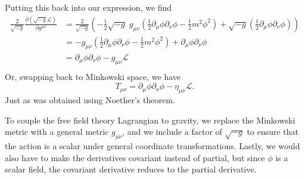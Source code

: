 \documentclass[12pt]{article}
\newcommand{\delmu}{\partial_{\mu}}
\newcommand{\delnu}{\partial_{\nu}}
\newcommand{\+}{\dagger}
\begin{document}
Putting this back into our expression, we find
\begin{align*}
    \frac{2}{\sqrt{-g}}\frac{\partial(\sqrt{-g}\mathcal{L})}{\partial g^{\mu\nu}}
    &= \frac{2}{\sqrt{-g}} \left( -\frac{1}{2}\sqrt{-g} \;
    g_{\mu\nu}\left(\frac{1}{2}\delmu\phi\delnu\phi - \frac{1}{2}m^2\phi^2\right)+
    \sqrt{-g}\left(\frac{1}{2}\delmu\phi\delnu\phi \right)\right)\\
    &= -g_{\mu\nu}\left(\frac{1}{2}\delmu\phi\delnu\phi - \frac{1}{2}m^2\phi^2\right) + \delmu\phi\delnu\phi \\
    &= \delmu\phi\delnu\phi - g_{\mu\nu}\mathcal{L}\\
\end{align*}
Or, swapping back to Minkowski space, we have
\begin{equation*}
    \boxed{T_{\mu\nu} = \delmu\phi\delnu\phi - \eta_{\mu\nu}\mathcal{L}.}
\end{equation*}
Just as was obtained using Noether's theorem.

To couple the free field theory Lagrangian to gravity, we replace the Minkowski
metric with a general metric $g_{\mu\nu}$, and we include a factor of
$\sqrt{-g}$ to ensure that the action is a scalar under general coordinate
transformations. Lastly, we would also have to make the derivatives covariant
instead of partial, but since $\phi$ is a scalar field, the covariant derivative
reduces to the partial derivative.
\end{document}
